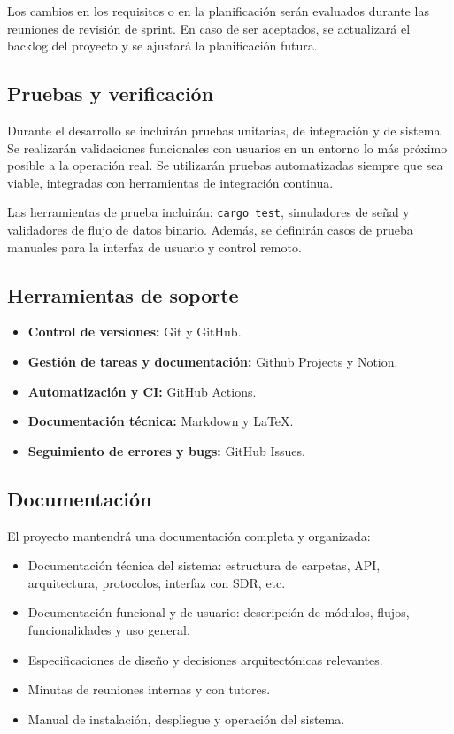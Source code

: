 Los cambios en los requisitos o en la planificación serán evaluados durante las reuniones de revisión de sprint. En caso de ser aceptados, se actualizará el backlog del proyecto y se ajustará la planificación futura.

\subsection*{Pruebas y verificación}

Durante el desarrollo se incluirán pruebas unitarias, de integración y de sistema. Se realizarán validaciones funcionales con usuarios en un entorno lo más próximo posible a la operación real. Se utilizarán pruebas automatizadas siempre que sea viable, integradas con herramientas de integración continua.

Las herramientas de prueba incluirán: \texttt{cargo test}, simuladores de señal y validadores de flujo de datos binario. Además, se definirán casos de prueba manuales para la interfaz de usuario y control remoto.

\subsection*{Herramientas de soporte}

\begin{itemize}
    \item \textbf{Control de versiones:} Git y GitHub.
    \item \textbf{Gestión de tareas y documentación:} Github Projects y Notion.
    \item \textbf{Automatización y CI:} GitHub Actions.
    \item \textbf{Documentación técnica:} Markdown y LaTeX.
    \item \textbf{Seguimiento de errores y bugs:} GitHub Issues.
\end{itemize}

\subsection*{Documentación}

El proyecto mantendrá una documentación completa y organizada:

\begin{itemize}
    \item Documentación técnica del sistema: estructura de carpetas, API, arquitectura, protocolos, interfaz con SDR, etc.
    \item Documentación funcional y de usuario: descripción de módulos, flujos, funcionalidades y uso general.
    \item Especificaciones de diseño y decisiones arquitectónicas relevantes.
    \item Minutas de reuniones internas y con tutores.
    \item Manual de instalación, despliegue y operación del sistema.
\end{itemize}

